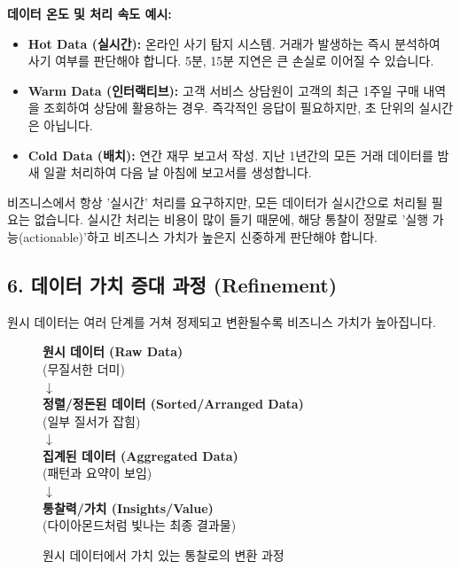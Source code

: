 \documentclass[11pt,a4paper]{article}
\theoremstyle{definition}
\begin{document}
\begin{examplebox}
\textbf{데이터 온도 및 처리 속도 예시:}
\begin{itemize}
    \item \textbf{Hot Data (실시간):} 온라인 사기 탐지 시스템. 거래가 발생하는 즉시 분석하여 사기 여부를 판단해야 합니다. 5분, 15분 지연은 큰 손실로 이어질 수 있습니다.
    \item \textbf{Warm Data (인터랙티브):} 고객 서비스 상담원이 고객의 최근 1주일 구매 내역을 조회하여 상담에 활용하는 경우. 즉각적인 응답이 필요하지만, 초 단위의 실시간은 아닙니다.
    \item \textbf{Cold Data (배치):} 연간 재무 보고서 작성. 지난 1년간의 모든 거래 데이터를 밤새 일괄 처리하여 다음 날 아침에 보고서를 생성합니다.
\end{itemize}
\end{examplebox}

\begin{warningbox}
비즈니스에서 항상 '실시간' 처리를 요구하지만, 모든 데이터가 실시간으로 처리될 필요는 없습니다. 실시간 처리는 비용이 많이 들기 때문에, 해당 통찰이 정말로 '실행 가능(actionable)'하고 비즈니스 가치가 높은지 신중하게 판단해야 합니다.
\end{warningbox}

\subsection*{6. 데이터 가치 증대 과정 (Refinement)}

원시 데이터는 여러 단계를 거쳐 정제되고 변환될수록 비즈니스 가치가 높아집니다.

\begin{figure}[h!]
    \centering
    \begin{tcolorbox}[colback=gray!10, colframe=gray!50!black, title={데이터 정제 과정 (개념도)}]
        \centering
        \textbf{원시 데이터 (Raw Data)} \\
        (무질서한 더미) \\
        $\downarrow$ \\
        \textbf{정렬/정돈된 데이터 (Sorted/Arranged Data)} \\
        (일부 질서가 잡힘) \\
        $\downarrow$ \\
        \textbf{집계된 데이터 (Aggregated Data)} \\
        (패턴과 요약이 보임) \\
        $\downarrow$ \\
        \textbf{통찰력/가치 (Insights/Value)} \\
        (다이아몬드처럼 빛나는 최종 결과물)
    \end{tcolorbox}
    \caption{원시 데이터에서 가치 있는 통찰로의 변환 과정}
    \label{fig:data_refinement}
\end{figure}
\end{document}
